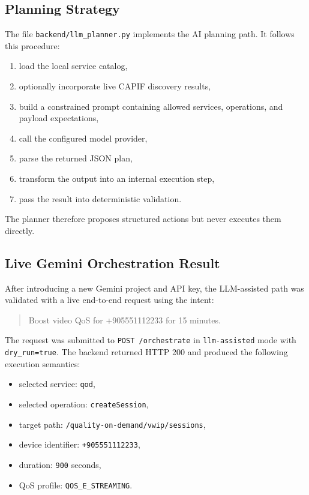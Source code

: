 \documentclass[conference]{IEEEtran}
\begin{document}
\subsection{Planning Strategy}

The file \texttt{backend/llm\_planner.py} implements the AI planning path. It follows this procedure:

\begin{enumerate}[leftmargin=1.1em]
\item load the local service catalog,
\item optionally incorporate live CAPIF discovery results,
\item build a constrained prompt containing allowed services, operations, and payload expectations,
\item call the configured model provider,
\item parse the returned JSON plan,
\item transform the output into an internal execution step,
\item pass the result into deterministic validation.
\end{enumerate}

The planner therefore proposes structured actions but never executes them directly.

\subsection{Live Gemini Orchestration Result}

After introducing a new Gemini project and API key, the LLM-assisted path was validated with a live end-to-end request using the intent:

\begin{quote}
Boost video QoS for +905551112233 for 15 minutes.
\end{quote}

The request was submitted to \texttt{POST /orchestrate} in \texttt{llm-assisted} mode with \texttt{dry\_run=true}. The backend returned HTTP 200 and produced the following execution semantics:

\begin{itemize}[leftmargin=1.1em]
\item selected service: \texttt{qod},
\item selected operation: \texttt{createSession},
\item target path: \texttt{/quality-on-demand/vwip/sessions},
\item device identifier: \texttt{+905551112233},
\item duration: \texttt{900} seconds,
\item QoS profile: \texttt{QOS\_E\_STREAMING}.
\end{itemize}
\end{document}
